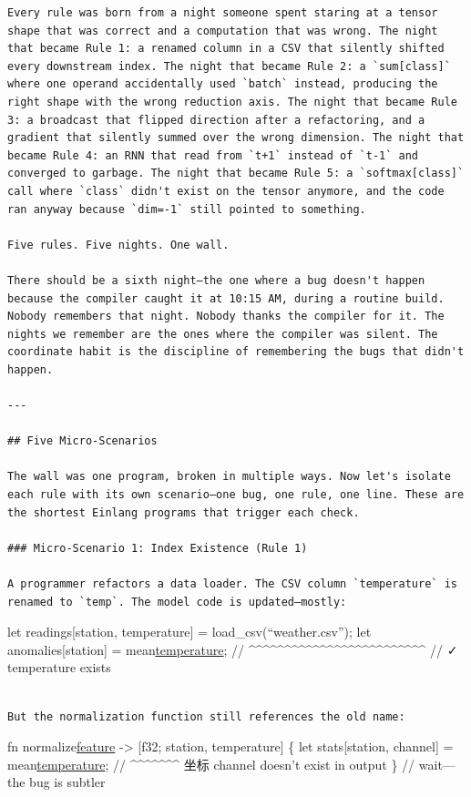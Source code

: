 \documentclass[11pt,titlepage]{article}
\begin{document}
\begin{verbatim}
Every rule was born from a night someone spent staring at a tensor shape that was correct and a computation that was wrong. The night that became Rule 1: a renamed column in a CSV that silently shifted every downstream index. The night that became Rule 2: a `sum[class]` where one operand accidentally used `batch` instead, producing the right shape with the wrong reduction axis. The night that became Rule 3: a broadcast that flipped direction after a refactoring, and a gradient that silently summed over the wrong dimension. The night that became Rule 4: an RNN that read from `t+1` instead of `t-1` and converged to garbage. The night that became Rule 5: a `softmax[class]` call where `class` didn't exist on the tensor anymore, and the code ran anyway because `dim=-1` still pointed to something.

Five rules. Five nights. One wall.

There should be a sixth night—the one where a bug doesn't happen because the compiler caught it at 10:15 AM, during a routine build. Nobody remembers that night. Nobody thanks the compiler for it. The nights we remember are the ones where the compiler was silent. The coordinate habit is the discipline of remembering the bugs that didn't happen.

---

## Five Micro-Scenarios

The wall was one program, broken in multiple ways. Now let's isolate each rule with its own scenario—one bug, one rule, one line. These are the shortest Einlang programs that trigger each check.

### Micro-Scenario 1: Index Existence (Rule 1)

A programmer refactors a data loader. The CSV column `temperature` is renamed to `temp`. The model code is updated—mostly:
\end{verbatim}

let readings{[}station, temperature{]} = load\_csv(``weather.csv''); let
anomalies{[}station{]} =
mean\href{readings\%5Bstation,\%20temperature\%5D}{temperature}; //
\^{}\^{}\^{}\^{}\^{}\^{}\^{}\^{}\^{}\^{}\^{}\^{}\^{}\^{}\^{}\^{}\^{}\^{}\^{}\^{}\^{}\^{}\^{}\^{}\^{}
// ✓ temperature exists

\begin{verbatim}

But the normalization function still references the old name:
\end{verbatim}

fn
normalize\href{x:\%20\%5Bf32;\%20station,\%20temperature\%5D}{feature}
-\textgreater{} {[}f32; station, temperature{]} \{ let stats{[}station,
channel{]} = mean\href{x\%5Bstation,\%20temperature\%5D}{temperature};
// \^{}\^{}\^{}\^{}\^{}\^{}\^{} 坐标 channel doesn't exist in output \}
// wait---the bug is subtler
\end{document}
